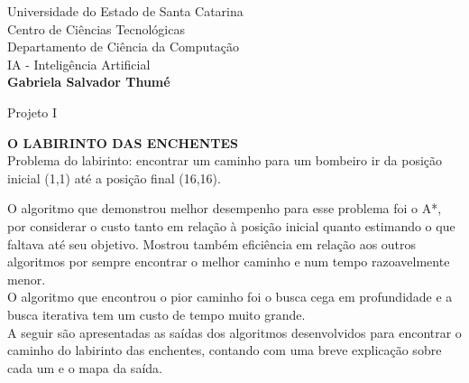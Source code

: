 \documentclass[10pt]{article}
\begin{document}
\begin{center}
\sc \sc
Universidade do Estado de Santa Catarina \\
Centro de Ciências Tecnológicas \\
Departamento de Ciência da Computação \\
IA - Inteligência Artificial \\
\textbf{Gabriela Salvador Thumé}
\end{center}

\begin{center}
\sc Projeto I
\end{center}


\vspace{10mm}
\textbf{O LABIRINTO DAS ENCHENTES} \\


\vspace{3mm}
Problema do labirinto: encontrar um caminho para um bombeiro ir da posição inicial (1,1) até a posição final (16,16). \\
\vspace{3mm}

O algoritmo que demonstrou melhor desempenho para esse problema foi o A*, por considerar o custo tanto em relação à posição inicial quanto estimando o que faltava até seu objetivo. Mostrou também eficiência em relação aos outros algoritmos por sempre encontrar o melhor caminho e num tempo razoavelmente menor. \\

O algoritmo que encontrou o pior caminho foi o busca cega em profundidade e a busca iterativa tem um custo de tempo muito grande. \\

A seguir são apresentadas as saídas dos algoritmos desenvolvidos para encontrar o caminho do labirinto das enchentes, contando com uma breve explicação sobre cada um e o mapa da saída. \\ 
\end{document}
